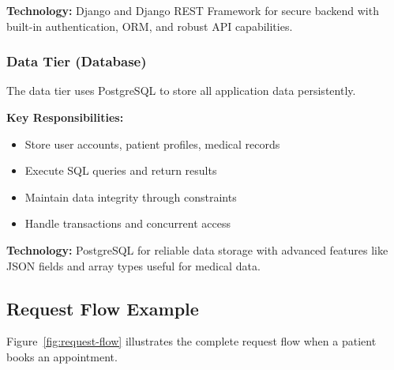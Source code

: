 \documentclass[11pt,a4paper]{article}
\begin{document}
\noindent
\textbf{Technology:} Django and Django REST Framework for secure backend with built-in authentication, ORM, and robust API capabilities.

\subsubsection{Data Tier (Database)}

The data tier uses PostgreSQL to store all application data persistently.

\noindent
\textbf{Key Responsibilities:}
\begin{itemize}
    \item Store user accounts, patient profiles, medical records
    \item Execute SQL queries and return results
    \item Maintain data integrity through constraints
    \item Handle transactions and concurrent access
\end{itemize}

\noindent
\textbf{Technology:} PostgreSQL for reliable data storage with advanced features like JSON fields and array types useful for medical data.

\subsection{Request Flow Example}

Figure~\ref{fig:request-flow} illustrates the complete request flow when a patient books an appointment.
\end{document}
